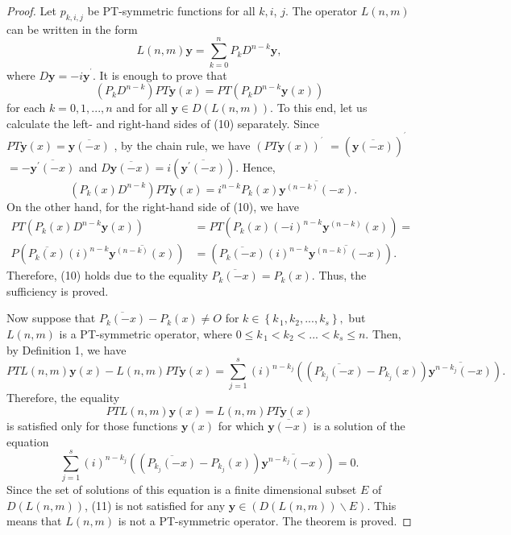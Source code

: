 \documentclass[10pt,a4paper]{amsart}
\begin{document}
\begin{proof}
\bigskip Let $p_{k,i,j}$ be PT-symmetric functions for all $k,i$, $j$. The
operator $L(n,m)$ can be written in the form
\[
L(n,m)\mathbf{y}=\sum_{k=0}^{n}P_{k}D^{n-k}\mathbf{y},
\]
where $D\mathbf{y}=-i\mathbf{y}^{^{\prime}}.$ It is enough to prove that
\begin{equation}
\left(  P_{k}D^{n-k}\right)  PT\mathbf{y}(x)=PT\left(  P_{k}D^{n-k}%
\mathbf{y}(x)\right)  \tag{10}%
\end{equation}
for each $k=0,1,...,n$ and for all $\mathbf{y}\in D(L(n,m)).$ To this end, let
us calculate the left- and right-hand sides of (10) separately. Since
$PT\mathbf{y}(x)=\overline{\mathbf{y}(-x)}$ , by the chain rule, we have
$\left(  PT\mathbf{y}(x)\right)  ^{^{\prime}}$ $=\left(  \overline
{\mathbf{y}(-x)}\right)  ^{^{\prime}}$ $=-\overline{\mathbf{y}^{\prime}(-x)}$
and $D\overline{\mathbf{y}(-x)}=i\left(  \overline{\mathbf{y}^{\prime}%
(-x)}\right)  .$ Hence,
\[
\text{ }\left(  P_{k}(x)D^{n-k}\right)  PT\mathbf{y}(x)=i^{n-k}P_{k}%
(x)\overline{\mathbf{y}^{(n-k)}(-x)}.
\]
On the other hand, for the right-hand side of (10), we have%
\begin{align*}
PT\left(  P_{k}(x)D^{n-k}\mathbf{y}(x)\right)   &  =PT\left(  P_{k}%
(x)(-i)^{n-k}\mathbf{y}^{(n-k)}(x)\right)  =\\
P(\overline{P_{k}(x)}(i)^{n-k}\overline{\mathbf{y}^{(n-k)}(x)})  &
=(\overline{P_{k}(-x)}(i)^{n-k}\overline{\mathbf{y}^{(n-k)}(-x)}).
\end{align*}
Therefore, (10) holds due to the equality $\overline{P_{k}(-x)}=P_{k}(x).$
Thus, the sufficiency is proved.

Now suppose that $\overline{P_{k}(-x)}-P_{k}(x)\neq O$ for $k\in\left\{
k_{\,1},k_{2},...,k_{s}\right\}  ,$ but $L(n,m)$ is a PT-symmetric operator,
where $0\leq k_{\,1}<k_{2}<...<k_{s}\leq n.$ Then, by Definition 1, we have
\[
PTL(n,m)\mathbf{y}(x)-L(n,m)PT\mathbf{y}(x)\mathbf{=}\sum_{j=1}^{s}%
(i)^{n-k_{j}}\left(  (\overline{P_{k_{j}}(-x)}-P_{k_{j}}(x))\overline
{\mathbf{y}^{n-k_{j}}(-x)}\right)  .
\]
Therefore, the equality
\begin{equation}
PTL(n,m)\mathbf{y}(x)=L(n,m)PT\mathbf{y}(x) \tag{11}%
\end{equation}
is satisfied only for those functions $\mathbf{y}(x)$ for which $\overline
{\mathbf{y}(-x)}$ is a solution of the equation
\[
\sum_{j=1}^{s}(i)^{n-k_{j}}\left(  (\overline{P_{k_{j}}(-x)}-P_{k_{j}%
}(x))\overline{\mathbf{y}^{n-k_{j}}(-x)}\right)  =0.
\]
Since the set of solutions of this equation is a finite dimensional subset $E$
of $D(L(n,m))$, (11) is not satisfied for any $\mathbf{y}\in\left(
D(L(n,m))\backslash E\right)  .$ This means that $L(n,m)$ is not a
PT-symmetric operator. The theorem is proved.
\end{proof}
\end{document}
